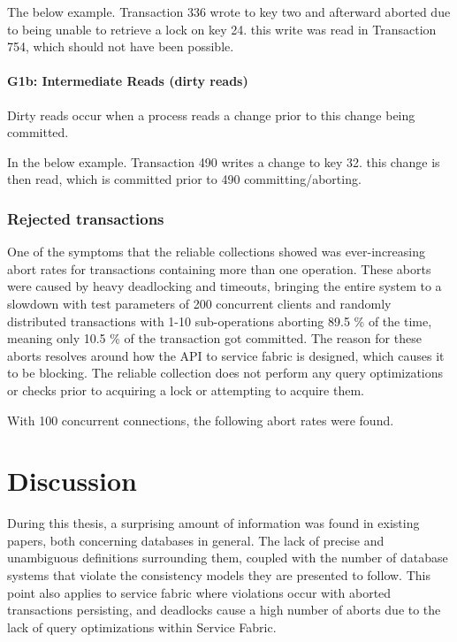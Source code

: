 \documentclass[a4paper,10pt,titlepage]{report}
\begin{document}
The below example. Transaction 336 wrote to key two and afterward aborted due to being unable to retrieve a lock on key 24. this write was read in Transaction 754, which should not have been possible.






\newpage
\subsubsection{G1b: Intermediate Reads (dirty reads)}
Dirty reads occur when a process reads a change prior to this change being committed. 

In the below example.
Transaction 490 writes a change to key 32. this change is then read, which is committed prior to 490 committing/aborting.






\newpage
\subsection{Rejected transactions}

One of the symptoms that the reliable collections showed was ever-increasing abort rates for transactions containing more than one operation. These aborts were caused by heavy deadlocking and timeouts, bringing the entire system to a slowdown with test parameters of 200 concurrent clients and randomly distributed transactions with 1-10 sub-operations aborting 89.5 \% of the time, meaning only 10.5 \% of the transaction got committed. The reason for these aborts resolves around how the API to service fabric is designed, which causes it to be blocking. The reliable collection does not perform any query optimizations or checks prior to acquiring a lock or attempting to acquire them. 

With 100 concurrent connections, the following abort rates were found. 



\chapter{Discussion}

During this thesis, a surprising amount of information was found in existing papers, both concerning databases in general. The lack of precise and unambiguous definitions surrounding them, coupled with the number of database systems that violate the consistency models they are presented to follow. This point also applies to service fabric where violations occur with aborted transactions persisting, and deadlocks cause a high number of aborts due to the lack of query optimizations within Service Fabric.\\ \vspace{5mm}
\end{document}
